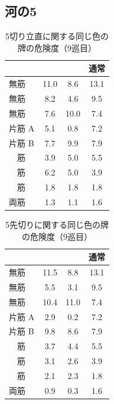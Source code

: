 \documentclass[10pt, twocolumn]{article}
\begin{document}
\subsection{河の5}

\begin{table}[ht]
  \centering
  \begin{tabular}{l|SSS}
     &  &  & 通常 \\
    \hline
    無筋    & 11.0 & 8.6 & 13.1 \\
    無筋    & 8.2  & 4.6 & 9.5 \\
    無筋    & 7.6  & 10.0 & 7.4 \\
    片筋  A & 5.1 & 0.8 & 7.2 \\
    片筋  B & 7.7 & 9.9 & 7.9 \\
    　筋    & 3.9 & 5.0 & 5.5 \\
    　筋    & 6.2 & 5.0 & 3.9 \\
    　筋    & 1.8 & 1.8 & 1.8 \\
    両筋    & 1.3 & 1.1 & 1.6
  \end{tabular}
  \caption{5切り立直に関する同じ色の牌の危険度（9巡目）\citep[][p. 162]{miinin-stat}}
  \label{tab:5rii}
\end{table}

\begin{table}[ht]
  \centering
  \begin{tabular}{l|SSS}
     &  &  & 通常 \\
    \hline
    無筋    & 11.5 & 8.8 & 13.1 \\
    無筋    & 5.5 & 3.1 & 9.5 \\
    無筋    & 10.4 & 11.0 & 7.4 \\
    片筋  A & 2.9 & 0.2 & 7.2 \\
    片筋  B & 9.8 & 8.6 & 7.9 \\
    　筋    & 3.7 & 4.4 & 5.5 \\
    　筋    & 3.1 & 2.6 & 3.9 \\
    　筋    & 2.1 & 2.3 & 1.8 \\
    両筋    & 0.9 & 0.3 & 1.6
  \end{tabular}
  \caption{5先切りに関する同じ色の牌の危険度（9巡目）\citep[][p. 162]{miinin-stat}}
  \label{tab:5saki}
\end{table}
\end{document}

